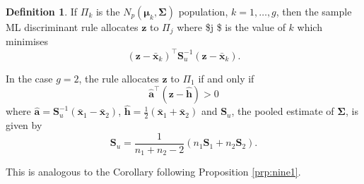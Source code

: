 \documentclass[]{book}
\theoremstyle{definition}
\newtheorem{definition}{Definition}[chapter]
\theoremstyle{definition}
\theoremstyle{definition}
\theoremstyle{remark}
\begin{document}
\begin{definition}
\protect\hypertarget{def:sampleML}{}{\label{def:sampleML} }If \(\Pi_k\) is the \(N_p(\boldsymbol \mu_k,\boldsymbol \Sigma)\) population, \(k=1,\ldots,g\), then the sample ML discriminant rule allocates \(\boldsymbol z\) to \(\Pi_j\) where \$j \$ is the value of \(k\) which minimises
\[(\boldsymbol z-\bar{\boldsymbol x}_k)^\top \boldsymbol S_u^{-1} (\boldsymbol z-\bar{\boldsymbol x}_k).\]
\end{definition}

In the case \(g=2\), the rule allocates \(\boldsymbol z\) to \(\Pi_1\) if and only if
\[\hat{\boldsymbol a}^\top (\boldsymbol z- \hat{\boldsymbol h}) > 0\]
where \(\hat{\boldsymbol a} = \boldsymbol S_u^{-1} (\bar{\boldsymbol x}_1 - \bar{\boldsymbol x}_2)\), \(\hat{\boldsymbol h} = \frac{1}{2} (\bar{\boldsymbol x}_1 + \bar{\boldsymbol x}_2)\) and \(\boldsymbol S_u\), the pooled estimate of \(\boldsymbol \Sigma\), is given by
\[ \boldsymbol S_u =  \frac{1}{n_1 + n_2 -2} (n_1 \boldsymbol S_1 + n_2 \boldsymbol S_2 ).\]

This is analogous to the Corollary following Proposition \ref{prp:nine1}.
\end{document}
